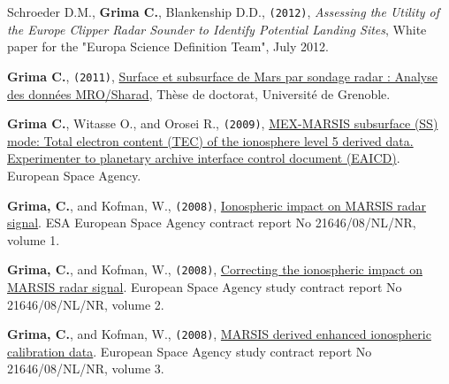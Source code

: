 \begin{etaremune}
\item
  Schroeder D.M., \textbf{Grima C.}, Blankenship D.D., \texttt{(2012)},
  \emph{Assessing the Utility of the Europe Clipper Radar Sounder to
  Identify Potential Landing Sites}, White paper for the "Europa Science
  Definition Team", July 2012.
  
\item
  \textbf{Grima C.}, \texttt{(2011)},
  \href{https://www.google.com/url?sa=t\&rct=j\&q=\&esrc=s\&source=web\&cd=2\&ved=0ahUKEwiu-Jn8t7LPAhWEOSYKHQOlBeUQFggrMAE\&url=http\%3A\%2F\%2Fwww.theses.fr\%2F2011GRENU004.pdf\&usg=AFQjCNFcVxpOJiku0pWYrUsHbDrZU01hiA\&sig2=RAzQ2GJJIpOr1U3PEjRsXw}{Surface
  et subsurface de Mars par sondage radar : Analyse des données
  MRO/Sharad}, Thèse de doctorat, Université de Grenoble.
  
\item
  \textbf{Grima C.}, Witasse O., and Orosei R., \texttt{(2009)},
  \href{https://archives.esac.esa.int/psa/ftp/MARS-EXPRESS/MARSIS/MEX-M-MARSIS-5-DDR-SS-TEC-V1.0/DOCUMENT/MARSIS_EAICD_TEC.PDF}{MEX-MARSIS subsurface (SS) mode: Total electron content (TEC) of the ionosphere level 5 derived data. Experimenter to planetary archive interface control document (EAICD)}. European Space Agency.
  
\item
  \textbf{Grima, C.}, and Kofman, W., \texttt{(2008)}, \href{https://archives.esac.esa.int/psa/ftp/MARS-EXPRESS/MARSIS/MEX-M-MARSIS-5-DDR-SS-TEC-V1.0/DOCUMENT/IONOPROCESS_REPORT1.PDF}{Ionospheric impact on MARSIS radar signal}. ESA European Space Agency contract report No 21646/08/NL/NR, volume 1.
  
\item
  \textbf{Grima, C.}, and Kofman, W., \texttt{(2008)}, \href{https://archives.esac.esa.int/psa/ftp/MARS-EXPRESS/MARSIS/MEX-M-MARSIS-5-DDR-SS-TEC-V1.0/DOCUMENT/IONOPROCESS_REPORT2.PDF}{Correcting
  the ionospheric impact on MARSIS radar signal}. European Space Agency
  study contract report No 21646/08/NL/NR, volume 2.
  
\item
  \textbf{Grima, C.}, and Kofman, W., \texttt{(2008)}, \href{https://archives.esac.esa.int/psa/ftp/MARS-EXPRESS/MARSIS/MEX-M-MARSIS-5-DDR-SS-TEC-V1.0/DOCUMENT/IONOPROCESS_REPORT3.PDF}{MARSIS
  derived enhanced ionospheric calibration data}. European Space Agency
  study contract report No 21646/08/NL/NR, volume 3.
\end{etaremune}
